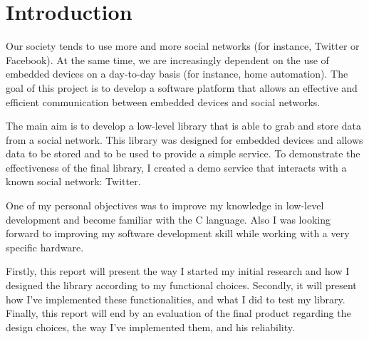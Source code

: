 \chapter{Introduction}

\hspace{15mm}Our society tends to use more and more social networks (for instance, Twitter or Facebook). At the same time, we are increasingly dependent on the use of embedded devices on a day-to-day basis (for instance, home automation). The goal of this project is to develop a software platform that allows an effective and efficient communication between embedded devices and social networks.

The main aim is to develop a low-level library that is able to grab and store data from a social network. This library was designed for embedded devices and allows data to be stored and to be used to provide a simple service. To demonstrate the effectiveness of the final library, I created a demo service that interacts with a known social network: Twitter.

One of my personal objectives was to improve my knowledge in low-level development and become familiar with the C language. Also I was looking forward to improving my software development skill while working with a very specific hardware.

Firstly, this report will present the way I started my initial research and how I designed the library according to my functional choices. Secondly, it will present how I've implemented these functionalities, and what I did to test my library. Finally, this report will end by an evaluation of the final product regarding the design choices, the way I've implemented them, and his reliability.


\clearpage

